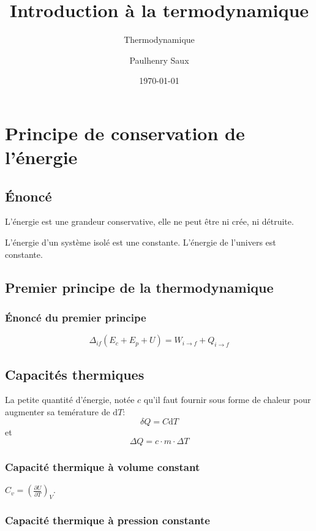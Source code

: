 \documentclass[french]{yLectureNote}
\title{Introduction à la termodynamique}
\subtitle{Thermodynamique}
\author{Paulhenry Saux}
\date{\today}
\newcommand{\dd}[0]{\mathrm{d}}
\begin{document}
\setcounter{chapter}{2}
\chapter{Principe de conservation de l'énergie}
\section{Énoncé}
\begin{theorem}
    L'énergie est une grandeur conservative, elle ne peut \^etre ni crée, ni détruite.
\end{theorem}
\begin{theorem}
    L'énergie d'un système isolé est une constante. L'énergie de l'univers est constante.
\end{theorem}
\section{Premier principe de la thermodynamique}
\subsection{Énoncé du premier principe}

\begin{theorem}
    $$\Delta_{if} (E_c+E_p+U) = W_{i \to f} + Q_{i\to f}$$
\end{theorem}
\section{Capacités thermiques}
\begin{definition}
    La petite quantité d'énergie, notée $c$ qu'il faut fournir sous forme de chaleur pour augmenter sa temérature de $\dd T$:
    $$\delta Q = C\dd T$$ et $$\Delta Q = c\cdot m\cdot \Delta T $$
\end{definition}
\subsection{Capacité thermique à volume constant}

\begin{theorem}
    $C_v = (\frac{\partial U}{\partial T})_V$.
\end{theorem}
\subsection{Capacité thermique à pression constante}
\end{document}
